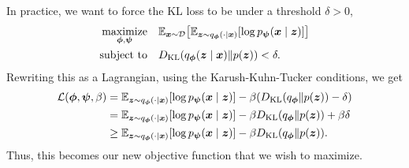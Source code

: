 In practice, we want to force the KL loss to be under a threshold $\delta > 0$,
\begin{align*}
    \underset{\vec{\phi},\vec{\psi}}{\text{maximize}} & \quad \E_{\vec{x} \sim \mathcal{D}} \lft[ \E_{\vec{z} \sim q_{\vec{\phi}}(\cdot \mid \vec{x})} \lft[ \log p_{\vec{\psi}}(\vec{x} \mid \vec{z}) \rgt] \rgt] \\
    \text{subject to}                                 & \quad D_{\mathrm{KL}} \lft( q_{\vec{\phi}}(\vec{z} \mid \vec{x}) \lVert p(\vec{z}) \rgt) < \delta.
\end{align*}
Rewriting this as a Lagrangian, using the Karush-Kuhn-Tucker conditions, we get
\begin{align*}
    \mathcal{L}(\bm{\phi},\bm{\psi},\beta) & = \mathbb{E}_{\bm{z} \sim q_{\bm{\phi}}(\cdot \mid \bm{x})} [\log p_{\bm{\psi}}(\bm{x} \mid \bm{z})] - \beta(D_{\mathrm{KL}}(q_{\bm{\phi}} \lVert p(\bm{z})) - \delta)      \\
                                             & = \mathbb{E}_{\bm{z} \sim q_{\bm{\phi}}(\cdot \mid \bm{x})} [\log p_{\bm{\psi}}(\bm{x} \mid \bm{z})] - \beta D_{\mathrm{KL}}(q_{\bm{\phi}} \lVert p(\bm{z})) + \beta \delta \\
                                             & \geq \mathbb{E}_{\bm{z} \sim q_{\bm{\phi}}(\cdot \mid \bm{x})} [\log p_{\bm{\psi}}(\bm{x} \mid \bm{z})] - \beta D_{\mathrm{KL}}(q_{\bm{\phi}} \lVert p(\bm{z})).
\end{align*}
Thus, this becomes our new objective function that we wish to maximize.
